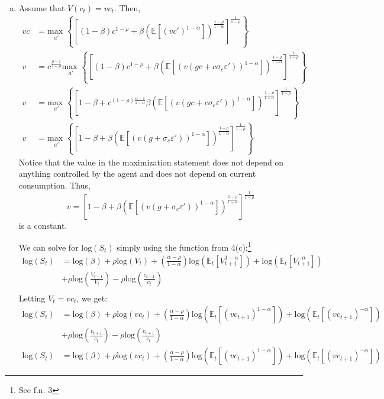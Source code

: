 \documentclass{article}
\newcommand{\loge}[1]{\text{log}\left(#1\right)}
\newcommand{\usmax}[1]{\underset{#1}{\text{max }}}
\newcommand{\E}[1]{\mathbb{E}\left[#1\right]} %
\newcommand{\Et}[1]{\mathbb{E}_t\left[#1\right]}
\begin{document}
\begin{enumerate}[(a)]
	
	\item Assume that ${V(c_t) = vc_t}$. Then,
		\begin{align*}
			vc 	&= \usmax{a'}\left\{\left[(1-\beta)c^{1-\rho}  + \beta\left(\E{(vc')^{1-\alpha}}\right)^{\frac{1-\rho}{1-\alpha}}\right]^{\frac{1}{1-\rho}}\right\}	\\
			v	&= c^{\frac{\rho-1}{1-\rho}}\usmax{a'}\left\{\left[(1-\beta)c^{1-\rho}  + \beta\left(\E{\left(v(gc + c\sigma_c\varepsilon')\right)^{1-\alpha}}\right)^{\frac{1-\rho}{1-\alpha}}\right]^{\frac{1}{1-\rho}}\right\}	\\
			v 	&= \usmax{a'}\left\{\left[1-\beta  + c^{(1-\rho)\frac{\alpha-1}{1-\alpha}}\beta\left(\E{\left(v(gc + c\sigma_c\varepsilon')\right)^{1-\alpha}}\right)^{\frac{1-\rho}{1-\alpha}}\right]^{\frac{1}{1-\rho}}\right\}	\\
			v 	&= \usmax{a'}\left\{\left[1-\beta  + \beta\left(\E{\left(v(g+ \sigma_c\varepsilon')\right)^{1-\alpha}}\right)^{\frac{1-\rho}{1-\alpha}}\right]^{\frac{1}{1-\rho}}\right\}
		\end{align*}
		Notice that the value in the maximization statement does not depend on anything controlled by the agent and does not depend on current consumption. Thus,
		\[
			v 	= \left[1-\beta  + \beta\left(\E{\left(v(g+ \sigma_c\varepsilon')\right)^{1-\alpha}}\right)^{\frac{1-\rho}{1-\alpha}}\right]^{\frac{1}{1-\rho}}
		\]
		is a constant.
		
		We can solve for $\loge{S_t}$ simply using the function from 4(c):\footnote{See f.n. 3}
		\begin{align*}
			\loge{S_t} &= \loge{\beta} +  \rho\loge{V_t} + \left(\frac{\alpha-\rho}{1-\alpha}\right)\loge{\Et{V_{t+1}^{1-\alpha}}} + \loge{\Et{V_{t+1}^{-\alpha}}} 	\\
				&+  \rho\loge{\frac{V_{t+1}}{V_{t}}}  - \rho\loge{\frac{c_{t+1}}{c_{t}}}	\\
		\end{align*}
		Letting ${V_t=vc_t}$, we get:
		\begin{align*}
			\loge{S_t} &= \loge{\beta} +  \rho\loge{vc_t} + \left(\frac{\alpha-\rho}{1-\alpha}\right)\loge{\Et{(vc_{t+1})^{1-\alpha}}} + \loge{\Et{(vc_{t+1})^{-\alpha}}} 	\\
				&+  \rho\loge{\frac{c_{t+1}}{c_{t}}}  - \rho\loge{\frac{c_{t+1}}{c_{t}}}	\\
				\loge{S_t} &= \loge{\beta} +  \rho\loge{vc_t} + \left(\frac{\alpha-\rho}{1-\alpha}\right)\loge{\Et{(vc_{t+1})^{1-\alpha}}} + \loge{\Et{(vc_{t+1})^{-\alpha}}}
		\end{align*}
	

\end{enumerate}
\end{document}
